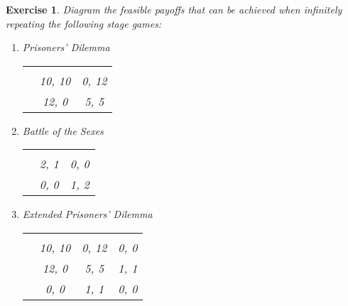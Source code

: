 \documentclass[letter, 10pt]{article}
\theoremstyle{basic}
\newtheorem{exercise}{Exercise}[]
\begin{document}
\begin{spacing}{1.0}
\newpage
\begin{exercise}
  Diagram the feasible payoffs that can be achieved when infinitely repeating the
  following stage games:
  \begin{enumerate}
  \item Prisoners' Dilemma
    \begin{center}
      \begin{tabular}{rcc}
        &  &    \\ \cline{2-3}
        \multicolumn{1}{l|}{} & 10, 10 & 0, 12  \\
        \multicolumn{1}{l|}{} & 12, 0  & 5, 5   \\
      \end{tabular}
    \end{center}
  \item Battle of the Sexes
    \begin{center}
      \begin{tabular}{rcc}
        &  &    \\ \cline{2-3}
        \multicolumn{1}{l|}{} & 2, 1 & 0, 0  \\
        \multicolumn{1}{l|}{} & 0, 0 & 1, 2  \\
      \end{tabular}
    \end{center}
  \item Extended Prisoners' Dilemma
    \begin{center}
    \begin{tabular}{rccc}
      &  &  &  \\ \cline{2-4}
      \multicolumn{1}{l|}{} & 10, 10 & 0, 12  & 0, 0 \\
      \multicolumn{1}{l|}{} & 12, 0  & 5, 5   & 1, 1  \\
      \multicolumn{1}{l|}{} & 0, 0   & 1, 1   & 0, 0  \\
    \end{tabular}
  \end{center}
  \end{enumerate}
\end{exercise}

\end{spacing}
\end{document}

